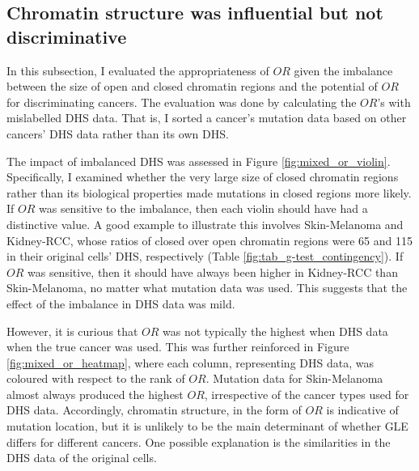 \subsection{Chromatin structure was influential but not discriminative}

In this subsection, I evaluated the appropriateness of $OR$ given the imbalance between the size of open and closed chromatin regions and the potential of $OR$ for discriminating cancers. The evaluation was done by calculating the $OR$'s with mislabelled DHS data. That is, I sorted a cancer's mutation data based on other cancers' DHS data rather than its own DHS. 

The impact of imbalanced DHS was assessed in Figure \ref{fig:mixed_or_violin}. Specifically, I examined whether the very large size of closed chromatin regions rather than its biological properties made mutations in closed regions more likely. If $OR$ was sensitive to the imbalance, then each violin should have had a distinctive value. A good example to illustrate this involves Skin-Melanoma and Kidney-RCC, whose ratios of closed over open chromatin regions were 65 and 115 in their original cells' DHS, respectively (Table \ref{fig:tab_g-test_contingency}). If $OR$ was sensitive, then it should have always been higher in Kidney-RCC than Skin-Melanoma, no matter what mutation data was used. This suggests that the effect of the imbalance in DHS data was mild.

However, it is curious that $OR$ was not typically the highest when DHS data when the true cancer was used. This was further reinforced in Figure \ref{fig:mixed_or_heatmap}, where each column, representing DHS data, was coloured with respect to the rank of $OR$. Mutation data for Skin-Melanoma almost always produced the highest $OR$, irrespective of the cancer types used for DHS data. Accordingly, chromatin structure, in the form of $OR$ is indicative of mutation location, but it is unlikely to be the main determinant of whether GLE differs for different cancers. One possible explanation is the similarities in the DHS data of the original cells.



